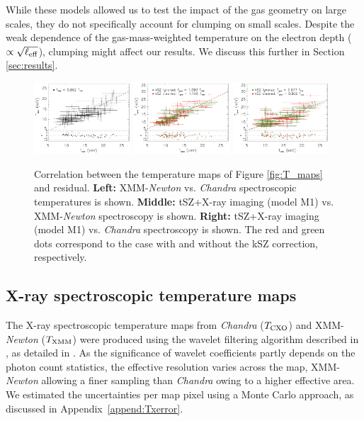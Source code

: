 \documentclass[twocolumn,traditabstract]{aa}
\begin{document}
While these models allowed us to test the impact of the gas geometry on large scales, they do not specifically account for clumping on small scales. Despite the weak dependence of the gas-mass-weighted temperature on the electron depth ($\propto \sqrt{\ell_{\rm eff}}$), clumping might affect our results. We discuss this further in Section \ref{sec:results}.

\begin{figure}[h]
\centering
\includegraphics[width=0.32\textwidth]{Figure/Thermo_correlation_TXMM-TCXO.pdf}
\includegraphics[width=0.32\textwidth]{Figure/Thermo_correlation_TXMM-TSZ_leff1.pdf}
\includegraphics[width=0.32\textwidth]{Figure/Thermo_correlation_TCXO-TSZ_leff1.pdf}
\caption{\footnotesize{Correlation between the temperature maps of Figure \ref{fig:T_maps} and residual. {\bf Left:} XMM-\textit{Newton} vs. \textit{Chandra} spectroscopic temperatures is shown. {\bf Middle:} tSZ+X-ray imaging (model M1) vs. XMM-\textit{Newton} spectroscopy is shown. {\bf Right:} tSZ+X-ray imaging (model M1) vs. \textit{Chandra} spectroscopy is shown. The red and green dots correspond to the case with and without the kSZ correction, respectively.}}
\label{fig:T_SZ_T_X_correlation}
\end{figure}

\subsection{X-ray spectroscopic temperature maps}\label{sec:Xray_spectroscopic_temperature_map}
The X-ray spectroscopic temperature maps from \textit{Chandra} (${T}_{\rm CXO}$) and XMM-\textit{Newton} (${T}_{\rm XMM}$) were produced using the wavelet filtering algorithm described in \cite{Bourdin2008}, as detailed in \cite{Adam2016b}. As the significance of wavelet coefficients partly depends on the photon count statistics, the effective resolution varies across the map, XMM-\textit{Newton} allowing a finer sampling than \textit{Chandra} owing to a higher effective area. We estimated the uncertainties per map pixel using a Monte Carlo approach, as discussed in Appendix~\ref{append:Txerror}.
\end{document}
